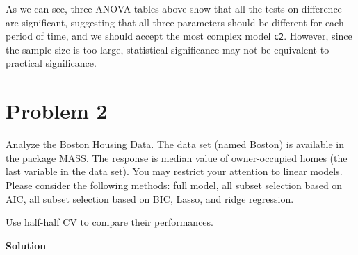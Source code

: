 \documentclass[12pt,oneside,a4paper]{article}\usepackage[]{graphicx}\usepackage[]{xcolor}
\newcommand{\problem}[1]
{
    \clearpage
    \section*{Problem {#1}}
}
\newcommand{\solution}
{
    \vspace{15pt}
    \noindent\ignorespaces\textbf{\large Solution}\par
}
\newcommand{\m}[1]{\texttt{{#1}}}
\begin{document}
As we can see, three ANOVA tables above show that all the tests on difference are significant, suggesting that all three parameters should be different for each period of time, and we should accept the most complex model \m{c2}. However, since the sample size is too large, statistical significance may not be equivalent to practical significance.

\problem{2}

Analyze the Boston Housing Data. The data set (named Boston) is available in the package MASS. The response is median value of owner-occupied homes (the last variable in the data set). You may restrict your attention to linear models. Please consider the following methods: full model, all subset selection based on AIC, all subset selection based on BIC, Lasso, and ridge regression. 

Use half-half CV to compare their performances. 

\solution
\end{document}
